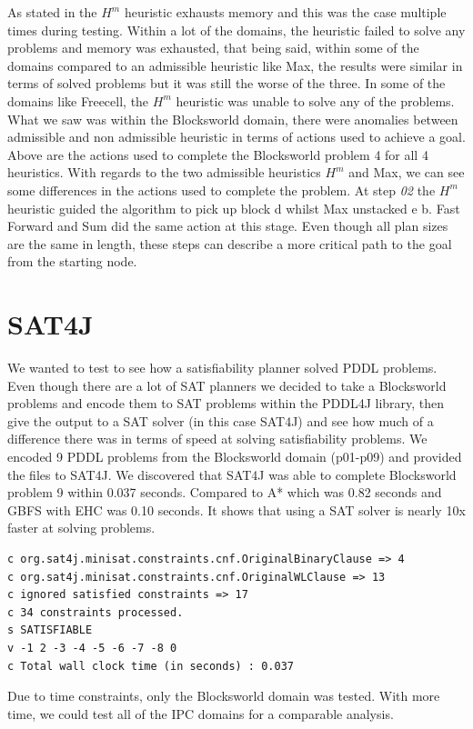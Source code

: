 As stated in \cite{HmHeuristic} the $H^m$ heuristic exhausts memory and this was the case multiple times during testing. Within a lot of the domains, the heuristic failed to solve any problems and memory was exhausted, that being said, within some of the domains compared to an admissible heuristic like Max, the results were similar in terms of solved problems but it was still the worse of the three. In some of the domains like Freecell, the $H^m$ heuristic was unable to solve any of the problems. 
What we saw was within the Blocksworld domain, there were anomalies between admissible and non admissible heuristic in terms of actions used to achieve a goal. 
Above are the actions used to complete the Blocksworld problem 4 for all 4 heuristics. With regards to the two admissible heuristics $H^m$ and Max, we can see some differences in the actions used to complete the problem. At step \textit{02} the $H^m$ heuristic guided the algorithm to pick up block d whilst Max unstacked e b. Fast Forward and Sum did the same action at this stage. Even though all plan sizes are the same in length, these steps can describe a more critical path to the goal from the starting node. 
\section{SAT4J}
We wanted to test to see how a satisfiability planner solved PDDL problems. Even though there are a lot of SAT planners\cite{BlackBox}\cite{SATPLAN} we decided to take a Blocksworld problems and encode them to SAT problems within the PDDL4J library, then give the output to a SAT solver (in this case SAT4J) and see how much of a difference there was in terms of speed at solving satisfiability problems. We encoded 9 PDDL problems from the Blocksworld domain (p01-p09) and provided the files to SAT4J. 
We discovered that SAT4J was able to complete Blocksworld problem 9 within 0.037 seconds. Compared to A* which was 0.82 seconds and GBFS with EHC was 0.10 seconds. It shows that using a SAT solver is nearly 10x faster at solving problems. 
\begin{verbatim}
c org.sat4j.minisat.constraints.cnf.OriginalBinaryClause => 4
c org.sat4j.minisat.constraints.cnf.OriginalWLClause => 13
c ignored satisfied constraints => 17
c 34 constraints processed.
s SATISFIABLE
v -1 2 -3 -4 -5 -6 -7 -8 0
c Total wall clock time (in seconds) : 0.037
\end{verbatim}
Due to time constraints, only the Blocksworld domain was tested. With more time, we could test all of the IPC domains for a comparable analysis. 
